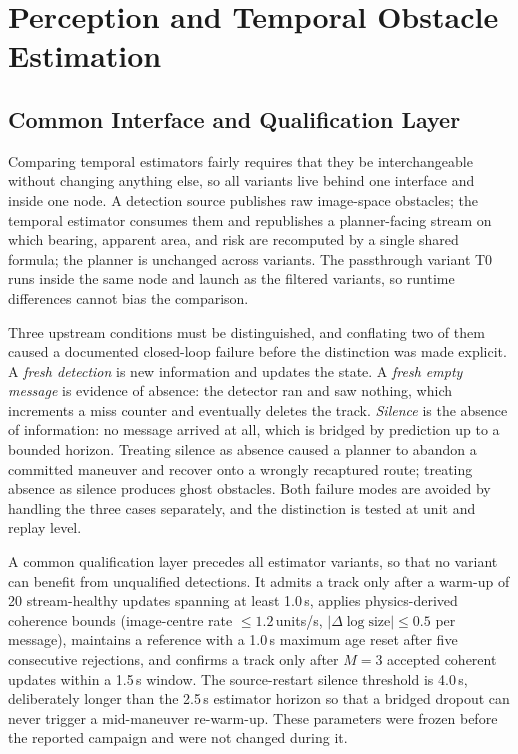 \section{Perception and Temporal Obstacle Estimation}
\label{sec:estimation}

\subsection{Common Interface and Qualification Layer}

Comparing temporal estimators fairly requires that they be interchangeable
without changing anything else, so all variants live behind one interface and
inside one node. A detection source publishes raw image-space obstacles; the
temporal estimator consumes them and republishes a planner-facing stream on
which bearing, apparent area, and risk are recomputed by a single shared
formula; the planner is unchanged across variants. The passthrough variant T0
runs inside the same node and launch as the filtered variants, so runtime
differences cannot bias the comparison.

Three upstream conditions must be distinguished, and conflating two of them
caused a documented closed-loop failure before the distinction was made
explicit. A \emph{fresh detection} is new information and updates the state.
A \emph{fresh empty message} is evidence of absence: the detector ran and saw
nothing, which increments a miss counter and eventually deletes the track.
\emph{Silence} is the absence of information: no message arrived at all,
which is bridged by prediction up to a bounded horizon. Treating silence as
absence caused a planner to abandon a committed maneuver and recover onto a
wrongly recaptured route; treating absence as silence produces ghost
obstacles. Both failure modes are avoided by handling the three cases
separately, and the distinction is tested at unit and replay level.

A common qualification layer precedes all estimator variants, so that no
variant can benefit from unqualified detections. It admits a track only after
a warm-up of 20 stream-healthy updates spanning at least 1.0\,s, applies
physics-derived coherence bounds (image-centre rate $\leq 1.2$\,units/s,
$|\Delta \log \text{size}| \leq 0.5$ per message), maintains a reference with
a 1.0\,s maximum age reset after five consecutive rejections, and confirms a
track only after $M=3$ accepted coherent updates within a 1.5\,s window. The
source-restart silence threshold is 4.0\,s, deliberately longer than the
2.5\,s estimator horizon so that a bridged dropout can never trigger a
mid-maneuver re-warm-up. These parameters were frozen before the reported
campaign and were not changed during it.

